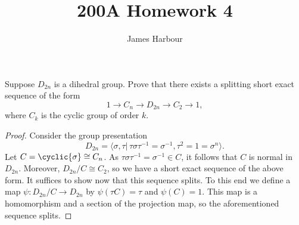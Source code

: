 \documentclass[12pt]{article}
\title{200A Homework 4}
\author{James Harbour}
\begin{document}
\maketitle
\begin{homeworkProblem}
  Suppose $D_{2n}$ is a dihedral group. Prove that there exists a splitting short exact sequence of the form
  \[
    1 \to C_n \to D_{2n} \to C_2 \to 1,
  \]
  where $C_k$ is the cyclic group of order $k$.

  \begin{proof}
    Consider the group presentation 
    \[
      D_{2n} = \langle \sigma, \tau |\, \tau\sigma \tau^{-1} = \sigma^{-1}, \tau^{2}=1 = \sigma^{n} \rangle.
    \]
    Let $ C = \cyclic{\sigma}\cong C_{n} $. As $ \tau \sigma \tau^{-1} = \sigma^{-1}\in C $, it follows that $ C $ is normal in $ D_{2n} $. Moreover, $ D_{2n}/C \cong C_{2} $, so we have a short exact sequence of the above form. It suffices to show now that this sequence splits. To this end we define a map $ \psi: D_{2n}/C \to D_{2n} $ by $ \psi( \tau C) = \tau $ and $ \psi(C) = 1 $.  This map is a homomorphism and a section of the projection map, so the aforementioned sequence splits.
  \end{proof}
\end{homeworkProblem}
\end{document}
